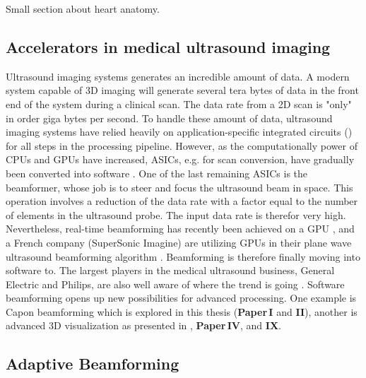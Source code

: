 Small section about heart anatomy.

\subsection{Accelerators in medical ultrasound imaging}
Ultrasound imaging systems generates an incredible amount of data. A modern system capable of 3D imaging will generate several tera bytes of data in the front end of the system during a clinical scan. The data rate from a 2D scan is "only" in order giga bytes per second. To handle these amount of data, ultrasound imaging systems have relied heavily on application-specific integrated circuits () for all steps in the processing pipeline. However, as the computationally power of CPUs and GPUs have increased, ASICs, e.g. for scan conversion, have gradually been converted into software \cite{Guracar2013}. One of  the last remaining ASICs is the beamformer, whose job is to steer and focus the ultrasound beam in space. This operation involves a reduction of the data rate with a factor equal to the number of elements in the ultrasound probe. The input data rate is therefor very high. Nevertheless, real-time beamforming has recently been achieved on a GPU \cite{Song2012}, and a French company (SuperSonic Imagine) are utilizing GPUs in their plane wave ultrasound beamforming algorithm \cite{Tanter2014}. Beamforming is therefore finally moving into software to. The largest players in the medical ultrasound business, General Electric and Philips, are also well aware of where the trend is going \cite{Thomenius2012} \cite{Metz2011}. Software beamforming opens up new possibilities for advanced processing. One example is Capon beamforming which is explored in this thesis (\textbf{Paper\,I} and \textbf{II}), another is advanced 3D visualization as presented in \cite{solteszova2010multidirectional}, \textbf{Paper\,IV}, and \textbf{IX}.

\subsection{Adaptive Beamforming}\label{sec:adaptbf}

